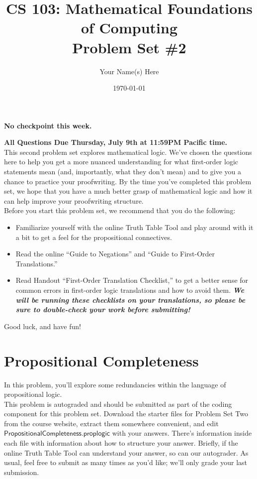 \documentclass{article}
\title{CS 103: Mathematical Foundations of Computing\\Problem Set \#2}
\author{Your Name(s) Here}
\date{\today}
\renewcommand{\(}{\left(}
\renewcommand{\)}{\right)}
\theoremstyle{plain}
\theoremstyle{plain}
\theoremstyle{definition}
\renewcommand{\emph}[1]{\textit{\textbf{#1}}}
\begin{document}
\maketitle

\textbf{No checkpoint this week.}

\textbf{All Questions Due Thursday, July 9th at 11:59PM Pacific time.} \\

This second problem set explores mathematical logic. We've chosen the questions here to help you get a more nuanced understanding for what first-order logic statements mean (and, importantly, what they don't mean) and to give you a chance to practice your proofwriting. By the time you've completed this problem set, we hope that you have a much better grasp of mathematical logic and how it can help improve your proofwriting structure. \\

Before you start this problem set, we recommend that you do the following:
\begin{itemize}
	\item Familiarize yourself with the online Truth Table Tool and play around with it a bit to get a feel for the propositional connectives.
 	\item Read the online ``Guide to Negations'' and ``Guide to First-Order Translations.''
	\item Read Handout ``First-Order Translation Checklist,'' to get a better sense for common errors in first-order logic translations and how to avoid them. \emph{We will be running these checklists on your translations, so please be sure to double-check your work before submitting!}
\end{itemize}
Good luck, and have fun! \pagebreak

\section{Propositional Completeness}
In this problem, you’ll explore some redundancies within the language of propositional logic.\\

This problem is autograded and should be submitted as part of the coding component for this problem
set. Download the starter files for Problem Set Two from the course website, extract them somewhere
convenient, and edit $\mathsf{PropositionalCompleteness.proplogic}$ with your answers. There’s information
inside each file with information about how to structure your answer. Briefly, if the online Truth Table
Tool can understand your answer, so can our autograder. As usual, feel free to submit as many times as
you’d like; we’ll only grade your last submission.\\
\end{document}
